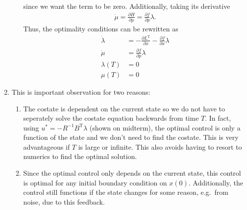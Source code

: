 \documentclass[letterpaper,11pt,titlepage]{article}
\newcommand{\trans}{^\text{T}}
\newcommand*\pder[2]{\frac{\partial #1}{\partial #2}}
\begin{document}
\begin{enumerate}[leftmargin=0pt]
\begin{enumerate}
\begin{gather}
    \end{gather}
    since we want the term to be zero. Additionally, taking its derivative
    \begin{gather}
      \dot\mu = \pder{H}{p} = \pder{f}{p} \lambda.
    \end{gather}
    Thus, the optimality conditions can be rewritten as
    \begin{align}
      \dot\lambda &= -\pder{L\trans}{x} - \pder{f}{x}\lambda \\
      \dot\mu &= \pder{f}{p} \lambda \\
      \lambda(T) &= 0 \\
      \mu(T) &= 0
    \end{align}
  \end{enumerate}

\item This is important observation for two reasons:
  \begin{enumerate}[label=\arabic*)]
  \item The costate is dependent on the current state so we do not have to seperately solve the costate equation backwards from time $T$. In fact, using $u^*=-R^{-1}B\trans\lambda$ (shown on midterm), the optimal control is only a function of the state and we don't need to find the costate. This is very advantageous if $T$ is large or infinite. This also avoids having to resort to numerics to find the optimal solution.
  \item Since the optimal control only depends on the current state, this control is optimal for any initial boundary condition on $x(0)$. Additionally, the control still functions if the state changes for some reason, e.g.\ from noise, due to this feedback.
  \end{enumerate}

\end{enumerate}
\end{document}
